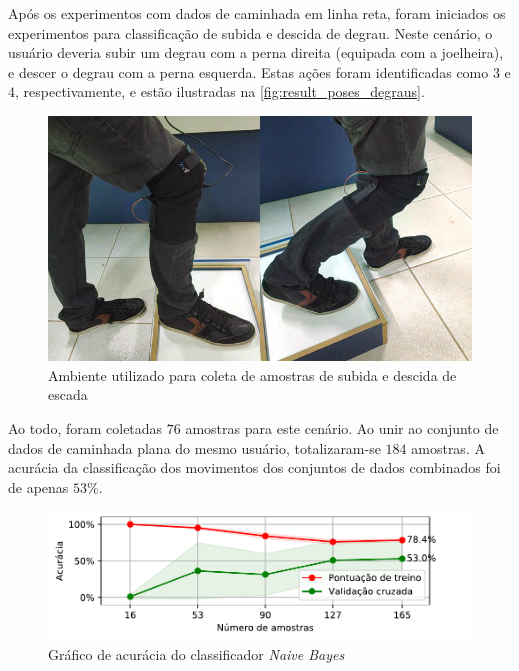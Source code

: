 Após os experimentos com dados de caminhada em linha reta, foram iniciados os experimentos para classificação de subida e descida de degrau. Neste cenário, o usuário deveria subir um degrau com a perna direita (equipada com a joelheira), e descer o degrau com a perna esquerda. Estas ações foram identificadas como \(3\) e \(4\), respectivamente, e estão ilustradas na \autoref{fig:result_poses_degraus}.

\begin{figure}[ht]
	\caption{\label{fig:result_poses_degraus}Ambiente utilizado para coleta de amostras de subida e descida de escada}
	\begin{center}
	    \includegraphics[width=.8\textwidth]{resources/result_poses_degraus}
	\end{center}
\end{figure}

Ao todo, foram coletadas \(76\) amostras para este cenário. Ao unir ao conjunto de dados de caminhada plana do mesmo usuário, totalizaram-se \(184\) amostras. A acurácia da classificação dos movimentos dos conjuntos de dados combinados foi de apenas \(53\%\).

\begin{figure}[ht]
	\caption{\label{fig:result_accuracy_degraus_1}Gráfico de acurácia do classificador \textit{Naive Bayes}}
	\begin{center}
	    \includegraphics[width=\textwidth]{resources/result_accuracy_degraus_1}
	\end{center}
\end{figure}

